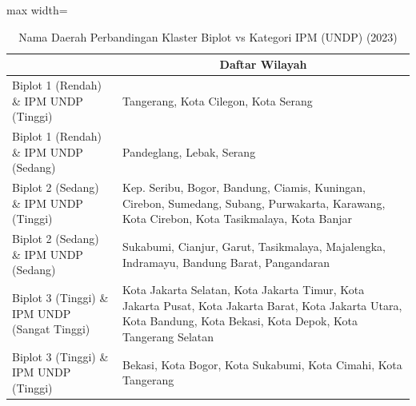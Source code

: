 \begin{table}[H]
\centering
\caption{Nama Daerah Perbandingan Klaster Biplot vs Kategori IPM (UNDP) (2023)} \label{tab:app2crossname2023}
\begin{adjustbox}{max width=\textwidth}
\begin{tabular}{|>{\centering\arraybackslash}p{4cm}|p{10cm}|}
\hline
\multicolumn{1}{|c|}{\textbf{Kategori}} & \multicolumn{1}{c|}{\textbf{Daftar Wilayah}} \\
\hline
Biplot 1 (Rendah) \& IPM UNDP (Tinggi) & Tangerang, Kota Cilegon, Kota Serang \\
\hline
Biplot 1 (Rendah) \& IPM UNDP (Sedang) & Pandeglang, Lebak, Serang \\
\hline
Biplot 2 (Sedang) \& IPM UNDP (Tinggi) & Kep. Seribu, Bogor, Bandung, Ciamis, Kuningan, Cirebon, Sumedang, Subang, Purwakarta, Karawang, Kota Cirebon, Kota Tasikmalaya, Kota Banjar \\
\hline
Biplot 2 (Sedang) \& IPM UNDP (Sedang) & Sukabumi, Cianjur, Garut, Tasikmalaya, Majalengka, Indramayu, Bandung Barat, Pangandaran \\
\hline
Biplot 3 (Tinggi) \& IPM UNDP (Sangat Tinggi) & Kota Jakarta Selatan, Kota Jakarta Timur, Kota Jakarta Pusat, Kota Jakarta Barat, Kota Jakarta Utara, Kota Bandung, Kota Bekasi, Kota Depok, Kota Tangerang Selatan \\
\hline
Biplot 3 (Tinggi) \& IPM UNDP (Tinggi) & Bekasi, Kota Bogor, Kota Sukabumi, Kota Cimahi, Kota Tangerang \\
\hline
\end{tabular}
\end{adjustbox}
\end{table}